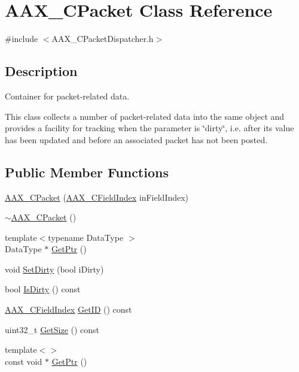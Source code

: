 \hypertarget{a01513}{}\section{A\+A\+X\+\_\+\+C\+Packet Class Reference}
\label{a01513}


{\ttfamily \#include $<$A\+A\+X\+\_\+\+C\+Packet\+Dispatcher.\+h$>$}



\subsection{Description}
Container for packet-\/related data. 

This class collects a number of packet-\/related data into the same object and provides a facility for tracking when the parameter is \char`\"{}dirty\char`\"{}, i.\+e. after its value has been updated and before an associated packet has not been posted. \subsection*{Public Member Functions}
\begin{DoxyCompactItemize}
\item 
\mbox{\hyperlink{a01513_aff3be2253e450887b07a519c84fe47e2}{A\+A\+X\+\_\+\+C\+Packet}} (\mbox{\hyperlink{a00392_ae807f8986143820cfb5d6da32165c9c7}{A\+A\+X\+\_\+\+C\+Field\+Index}} in\+Field\+Index)
\item 
\mbox{\hyperlink{a01513_ac0dc6c7d54d3e2d8b2717dcc55be839e}{$\sim$\+A\+A\+X\+\_\+\+C\+Packet}} ()
\item 
{\footnotesize template$<$typename Data\+Type $>$ }\\Data\+Type $\ast$ \mbox{\hyperlink{a01513_a4f9bbeedcad126dd34e797ac4c8fc736}{Get\+Ptr}} ()
\item 
void \mbox{\hyperlink{a01513_a43449a06b1c20f85b90560ec30057570}{Set\+Dirty}} (bool i\+Dirty)
\item 
bool \mbox{\hyperlink{a01513_a087f1867ade547149158bc623a614b16}{Is\+Dirty}} () const
\item 
\mbox{\hyperlink{a00392_ae807f8986143820cfb5d6da32165c9c7}{A\+A\+X\+\_\+\+C\+Field\+Index}} \mbox{\hyperlink{a01513_ace0acc2bdd1d8df32e3ebe50d82498c6}{Get\+ID}} () const
\item 
uint32\+\_\+t \mbox{\hyperlink{a01513_a920ae1897adc0bbbea0b33000a9328b5}{Get\+Size}} () const
\item 
{\footnotesize template$<$$>$ }\\const void $\ast$ \mbox{\hyperlink{a01513_a14cb7e34d64f05dd57ff8b903602f32b}{Get\+Ptr}} ()
\end{DoxyCompactItemize}



